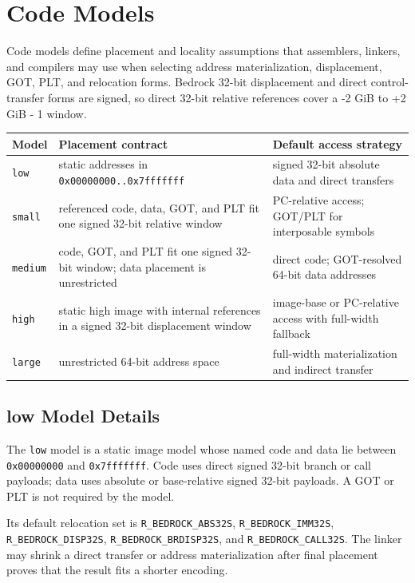 \documentclass[10pt,twoside]{article}
\begin{document}
\section{Code Models}\label{page:code-models}
Code models define placement and locality assumptions that assemblers, linkers, and compilers may use when selecting address materialization, displacement, GOT, PLT, and relocation forms. Bedrock 32-bit displacement and direct control-transfer forms are signed, so direct 32-bit relative references cover a -2 GiB to +2 GiB - 1 window.
\begingroup\footnotesize
\setlength{\tabcolsep}{2pt}
\begin{longtable}{@{}p{0.65in}p{2.25in}p{2.60in}@{}}
\toprule
\textbf{Model} & \textbf{Placement contract} & \textbf{Default access strategy}\\
\midrule
\endhead
\texttt{low} & static addresses in \texttt{0x00000000..0x7fffffff} & signed 32-bit absolute data and direct transfers\\
\texttt{small} & referenced code, data, GOT, and PLT fit one signed 32-bit relative window & PC-relative access; GOT/PLT for interposable symbols\\
\texttt{medium} & code, GOT, and PLT fit one signed 32-bit window; data placement is unrestricted & direct code; GOT-resolved 64-bit data addresses\\
\texttt{high} & static high image with internal references in a signed 32-bit displacement window & image-base or PC-relative access with full-width fallback\\
\texttt{large} & unrestricted 64-bit address space & full-width materialization and indirect transfer\\
\bottomrule
\end{longtable}
\endgroup
\subsection{low Model Details}
The \texttt{low} model is a static image model whose named code and data lie
between \texttt{0x00000000} and \texttt{0x7fffffff}. Code uses direct signed
32-bit branch or call payloads; data uses absolute or base-relative signed
32-bit payloads. A GOT or PLT is not required by the model.

Its default relocation set is \texttt{R\_BEDROCK\_ABS32S},
\texttt{R\_BEDROCK\_IMM32S}, \texttt{R\_BEDROCK\_DISP32S},
\texttt{R\_BEDROCK\_BRDISP32S}, and \texttt{R\_BEDROCK\_CALL32S}. The linker
may shrink a direct transfer or address materialization after final placement
proves that the result fits a shorter encoding.
\end{document}
